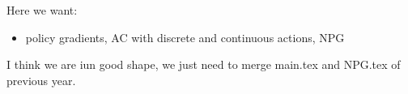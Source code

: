 \documentclass[12pt]{article}
\begin{document}
Here we want:

\begin{itemize}
    \item policy gradients, AC with discrete and continuous actions, NPG
    
\end{itemize}

I think we are iun good shape, we just need to merge main.tex and NPG.tex of previous year.
\end{document}
